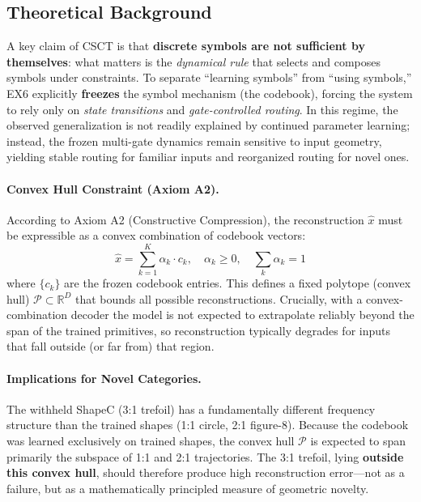\documentclass{article}
\begin{document}
\subsection{Theoretical Background}
A key claim of CSCT is that \textbf{discrete symbols are not sufficient by themselves}: what matters is the \emph{dynamical rule} that selects and composes symbols under constraints.
To separate ``learning symbols'' from ``using symbols,'' EX6 explicitly \textbf{freezes} the symbol mechanism (the codebook), forcing the system to rely only on \emph{state transitions} and \emph{gate-controlled routing}.
In this regime, the observed generalization is not readily explained by continued parameter learning; instead, the frozen multi-gate dynamics remain sensitive to input geometry, yielding stable routing for familiar inputs and reorganized routing for novel ones.

\paragraph{Convex Hull Constraint (Axiom A2).}
According to Axiom A2 (Constructive Compression), the reconstruction $\hat{x}$ must be expressible as a convex combination of codebook vectors:
\begin{equation}
    \hat{x} = \sum_{k=1}^{K} \alpha_k \cdot c_k, \quad \alpha_k \geq 0, \quad \sum_k \alpha_k = 1
\end{equation}
where $\{c_k\}$ are the frozen codebook entries.
This defines a fixed polytope (convex hull) $\mathcal{P} \subset \mathbb{R}^D$ that bounds all possible reconstructions.
Crucially, with a convex-combination decoder the model is not expected to extrapolate reliably beyond the span of the trained primitives, so reconstruction typically degrades for inputs that fall outside (or far from) that region.

\paragraph{Implications for Novel Categories.}
The withheld ShapeC (3:1 trefoil) has a fundamentally different frequency structure than the trained shapes (1:1 circle, 2:1 figure-8).
Because the codebook was learned exclusively on trained shapes, the convex hull $\mathcal{P}$ is expected to span primarily the subspace of 1:1 and 2:1 trajectories.
The 3:1 trefoil, lying \textbf{outside this convex hull}, should therefore produce high reconstruction error---not as a failure, but as a mathematically principled measure of geometric novelty.
\end{document}

